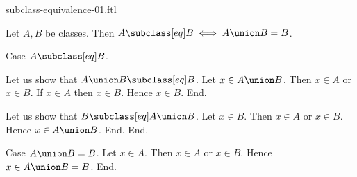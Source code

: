 \documentclass{article}
\begin{document}
\begin{smodule}[creators={Marcel Schütz}]{subclass-equivalence-01.ftl}

  \begin{fproposition*}[label=1190630472548352]
    Let $A, B$ be classes.
    Then $A \subclass[eq] B \iff A \union B = B$.
  \end{fproposition*}
  \begin{fproof}
    Case $A \subclass[eq] B$.

      Let us show that $A \union B \subclass[eq] B$.
        Let $x \in A \union B$.
        Then $x \in A$ or $x \in B$.
        If $x \in A$ then $x \in B$.
        Hence $x \in B$.
      End.

      Let us show that $B \subclass[eq] A \union B$.
        Let $x \in B$.
        Then $x \in A$ or $x \in B$.
        Hence $x \in A \union B$.
      End.
    End.

    Case $A \union B = B$.
      Let $x \in A$.
      Then $x \in A$ or $x \in B$.
      Hence $x \in A \union B = B$.
    End.
  \end{fproof}
\end{smodule}
\end{document}
